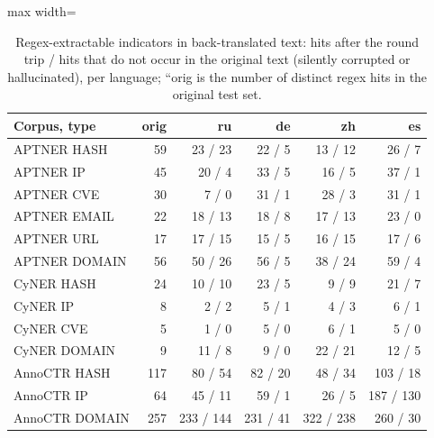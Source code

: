 \begin{table}[t]
\centering
\caption{Regex-extractable indicators in back-translated text: hits after the round trip / hits that do not occur in the original text (silently corrupted or hallucinated), per language; ``orig is the number of distinct regex hits in the original test set.}
\label{tab:ioccorrupt}
\small
\begin{adjustbox}{max width=\textwidth}
\begin{tabular}{lrrrrr}
\toprule
Corpus, type & orig & ru & de & zh & es \\
\midrule
APTNER HASH & 59 & 23 / 23 & 22 / 5 & 13 / 12 & 26 / 7 \\
APTNER IP & 45 & 20 / 4 & 33 / 5 & 16 / 5 & 37 / 1 \\
APTNER CVE & 30 & 7 / 0 & 31 / 1 & 28 / 3 & 31 / 1 \\
APTNER EMAIL & 22 & 18 / 13 & 18 / 8 & 17 / 13 & 23 / 0 \\
APTNER URL & 17 & 17 / 15 & 15 / 5 & 16 / 15 & 17 / 6 \\
APTNER DOMAIN & 56 & 50 / 26 & 56 / 5 & 38 / 24 & 59 / 4 \\
CyNER HASH & 24 & 10 / 10 & 23 / 5 & 9 / 9 & 21 / 7 \\
CyNER IP & 8 & 2 / 2 & 5 / 1 & 4 / 3 & 6 / 1 \\
CyNER CVE & 5 & 1 / 0 & 5 / 0 & 6 / 1 & 5 / 0 \\
CyNER DOMAIN & 9 & 11 / 8 & 9 / 0 & 22 / 21 & 12 / 5 \\
AnnoCTR HASH & 117 & 80 / 54 & 82 / 20 & 48 / 34 & 103 / 18 \\
AnnoCTR IP & 64 & 45 / 11 & 59 / 1 & 26 / 5 & 187 / 130 \\
AnnoCTR DOMAIN & 257 & 233 / 144 & 231 / 41 & 322 / 238 & 260 / 30 \\
\bottomrule
\end{tabular}
\end{adjustbox}
\end{table}